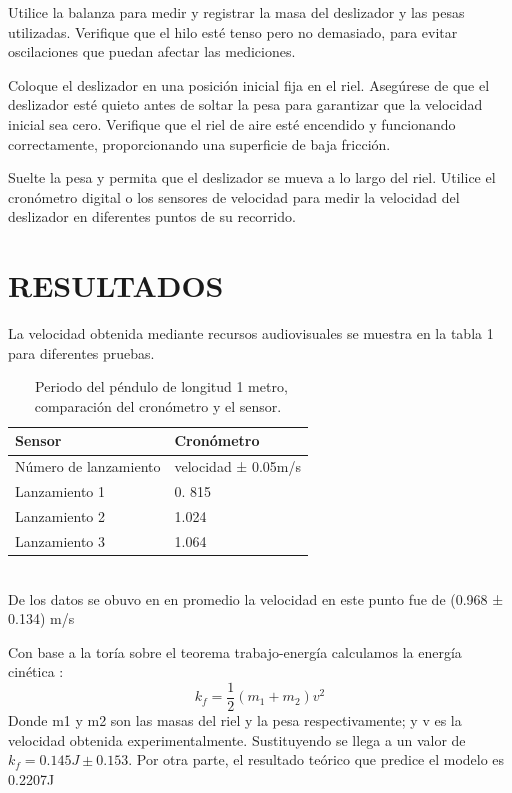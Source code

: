 \documentclass[journal]{IEEEtran}
\begin{document}
Utilice la balanza para medir y registrar la masa del deslizador y las pesas utilizadas.
Verifique que el hilo esté tenso pero no demasiado, para evitar oscilaciones que puedan afectar las mediciones.

Coloque el deslizador en una posición inicial fija en el riel.
Asegúrese de que el deslizador esté quieto antes de soltar la pesa para garantizar que la velocidad inicial sea cero.
Verifique que el riel de aire esté encendido y funcionando correctamente, proporcionando una superficie de baja fricción.

Suelte la pesa y permita que el deslizador se mueva a lo largo del riel.
Utilice el cronómetro digital o los sensores de velocidad para medir la velocidad del deslizador en diferentes puntos de su recorrido.

\hfill 

\section{RESULTADOS}

La velocidad obtenida mediante recursos audiovisuales se muestra en la tabla 1 para diferentes pruebas.
\begin{table}[!ht]
    \centering
     \caption{\ Periodo del péndulo de longitud 1 metro, comparación del cronómetro y el sensor.}
    \begin{tabular}{|l|l|}
    \hline
        Sensor & Cronómetro \\ \hline
        Número de lanzamiento & velocidad ± 0.05m/s \\ \hline
        
        Lanzamiento 1 & 0. 815 \\ \hline
        Lanzamiento 2 & 1.024 \\ \hline
        Lanzamiento 3 & 1.064\\ \hline
    \end{tabular}
\end{table}\\

De los datos se obuvo en en promedio la velocidad en este punto fue de (0.968 ± 0.134) m/s

Con base a la toría sobre el teorema trabajo-energía calculamos la energía cinética :
\begin{equation}\label{eq:6}
    k_f = \frac{1}{2}(m_1+m_2)v^2
\end{equation}
Donde  m1 y m2 son las masas del riel y la pesa respectivamente; y v es la velocidad obtenida experimentalmente.
Sustituyendo se llega a un valor de \(k_f = 0.145J \pm 0.153\).
Por otra parte, el resultado teórico que predice el modelo es 0.2207J
\end{document}
